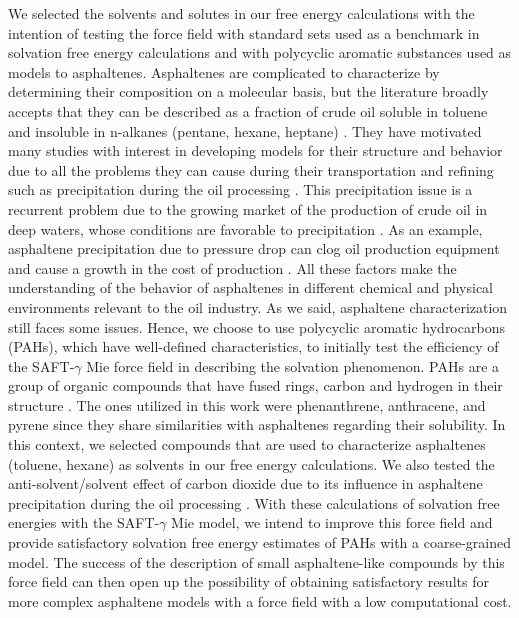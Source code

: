 \documentclass[final,12p,times,twocolumn]{elsarticle}
\begin{document}
	We selected the solvents and solutes in our free energy calculations with the intention of testing the force field with standard sets used as a benchmark in solvation free energy calculations and with polycyclic aromatic substances used as models to asphaltenes. Asphaltenes are complicated to characterize by determining their composition on a molecular basis, but the literature broadly accepts that they can be described as a fraction of crude oil soluble in toluene and insoluble in n-alkanes (pentane, hexane, heptane) \cite{SJOBLOM2003399}. They have motivated many studies with interest in developing models for their structure and behavior due to all the problems they can cause during their transportation and refining such as precipitation during the oil processing \cite{SJOBLOM20151}. This precipitation issue is a recurrent problem due to the growing market of the production of crude oil in deep waters, whose conditions are favorable to precipitation \cite{AIC:AIC10243}. As an example, asphaltene precipitation due to pressure drop can clog oil production equipment and cause a growth in the cost of production \cite{doi:10.1021/ef010047l}. All these factors make the understanding of the behavior of asphaltenes in different chemical and physical environments relevant to the oil industry. As we said, asphaltene characterization still faces some issues. Hence, we choose to use polycyclic aromatic hydrocarbons (PAHs), which have well-defined characteristics, to initially test the efficiency of the SAFT-$\gamma$ Mie force field in describing the solvation phenomenon. PAHs are a group of organic compounds that have fused rings, carbon and hydrogen in their structure \cite{RAVINDRA20082895}. The ones utilized in this work were phenanthrene, anthracene, and pyrene since they share similarities with asphaltenes regarding their solubility. In this context,  we selected compounds that are used to characterize asphaltenes (toluene, hexane) as solvents in our free energy calculations. We also tested the anti-solvent/solvent effect of carbon dioxide due to its influence in asphaltene precipitation during the oil processing \cite{SOROUSH2014405}. With these calculations of solvation free energies with the SAFT-$\gamma$ Mie model, we intend to improve this force field and provide satisfactory solvation free energy estimates of PAHs with a coarse-grained model. The success of the description of small asphaltene-like compounds by this force field can then open up the possibility of obtaining satisfactory results for more complex asphaltene models with a force field with a low computational cost.
	
\end{document}

